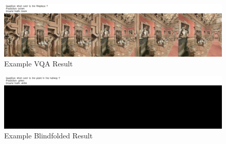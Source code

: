 
\begin{figure}[ht!]
	\centering
        \includegraphics[width=\textwidth]{./figure/results/baseline_and_blindfolding/images/ckpt_23_781_image.jpg}
	\caption{Example VQA Result} %
	\label{fig:example_vqa_result}
\end{figure}
	

\begin{figure}[ht!]
	\centering
        \includegraphics[width=\textwidth]{./figure/results/baseline_and_blindfolding/blindfolded/ckpt_23_1250_image.jpg}
	\caption{Example Blindfolded Result}
	\label{fig:example_blindfolded_result}
\end{figure}


